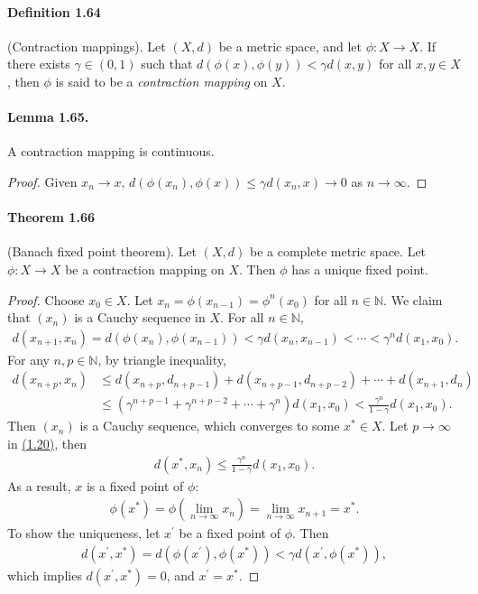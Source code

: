 \documentclass{article}
\begin{document}
\paragraph{Definition 1.64\label{def:1.64}} (Contraction mappings). Let $(X,d)$ be a metric space, and let $\phi:X\to X$. If there exists $\gamma\in (0,1)$ such that $d(\phi(x),\phi(y)) < \gamma d(x,y)$ for all $x,y\in X$, then $\phi$ is said to be a \textit{contraction mapping} on $X$.

\paragraph{Lemma 1.65.\label{lemma:1.65}} A contraction mapping is continuous.
\begin{proof}
	Given $x_n\to x$, $d(\phi(x_n),\phi(x))\leq\gamma d(x_n,x)\to 0$ as $n\to\infty$.
\end{proof}

\paragraph{Theorem 1.66\label{thm:1.66}} (Banach fixed point theorem). Let $(X,d)$ be a complete metric space. Let $\phi:X\to X$ be a contraction mapping on $X$. Then $\phi$ has a unique fixed point.
\begin{proof}
Choose $x_0\in X$. Let $x_n=\phi(x_{n-1})=\phi^n(x_0)$ for all $n\in\mathbb{N}$. We claim that $(x_n)$ is a Cauchy sequence in $X$. For all $n\in\mathbb{N}$,
\begin{align*}
d(x_{n+1},x_n) = d\left(\phi(x_n),\phi(x_{n-1})\right) < \gamma d(x_n,x_{n-1})<\cdots < \gamma^n d(x_1,x_0). 
\end{align*}
For any $n,p\in\mathbb{N}$, by triangle inequality,
\begin{align*}
	d(x_{n+p},x_n)&\leq d(x_{n+p},d_{n+p-1}) + d(x_{n+p-1},d_{n+p-2}) +\cdots + d(x_{n+1},d_{n})\\
	&\leq \left(\gamma^{n+p-1} + \gamma^{n+p-2} + \cdots + \gamma^n\right) d(x_1,x_0) < \frac{\gamma^n}{1-\gamma}d(x_1,x_0).\tag{1.20}\label{eq:1.20}
\end{align*}
Then $(x_n)$ is a Cauchy sequence, which converges to some $x^*\in X$. Let $p\to\infty$ in \hyperref[eq:1.20]{(1.20)}, then
\begin{align*}
	d(x^*,x_n)\leq\frac{\gamma^n}{1-\gamma}d(x_1,x_0).
\end{align*}
As a result, $x$ is a fixed point of $\phi$:
\begin{align*}
	\phi(x^*) = \phi\left(\lim_{n\to\infty}x_n\right) = \lim_{n\to\infty} x_{n+1} = x^*.
\end{align*}
To show the uniqueness, let $x^\prime$ be a fixed point of $\phi$. Then
\begin{align*}
	d(x^\prime,x^*) = d(\phi(x^\prime),\phi(x^*)) < \gamma d(x^\prime,\phi(x^*)),
\end{align*}
which implies $d(x^\prime,x^*)=0$, and $x^\prime=x^*$.
\end{proof}
\end{document}
